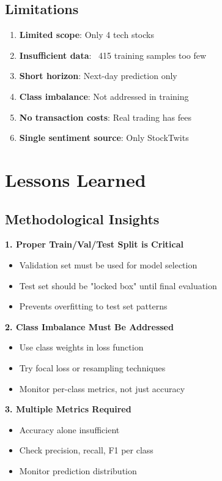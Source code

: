 \documentclass[10pt,twocolumn]{article}
\begin{document}
\subsection{Limitations}

\begin{enumerate}
\item \textbf{Limited scope}: Only 4 tech stocks
\item \textbf{Insufficient data}: ~415 training samples too few
\item \textbf{Short horizon}: Next-day prediction only
\item \textbf{Class imbalance}: Not addressed in training
\item \textbf{No transaction costs}: Real trading has fees
\item \textbf{Single sentiment source}: Only StockTwits
\end{enumerate}

\section{Lessons Learned}

\subsection{Methodological Insights}

\textbf{1. Proper Train/Val/Test Split is Critical}
\begin{itemize}
\item Validation set must be used for model selection
\item Test set should be "locked box" until final evaluation
\item Prevents overfitting to test set patterns
\end{itemize}

\textbf{2. Class Imbalance Must Be Addressed}
\begin{itemize}
\item Use class weights in loss function
\item Try focal loss or resampling techniques
\item Monitor per-class metrics, not just accuracy
\end{itemize}

\textbf{3. Multiple Metrics Required}
\begin{itemize}
\item Accuracy alone insufficient
\item Check precision, recall, F1 per class
\item Monitor prediction distribution
\end{itemize}
\end{document}
